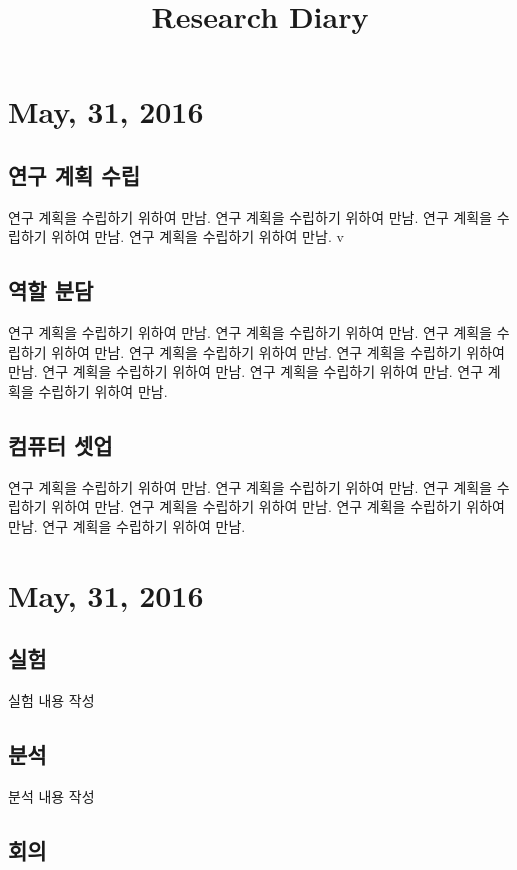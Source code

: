 \documentclass{research-note-v1.0}
\begin{document}
	\title{Research Diary}
			
	\section*{May, 31, 2016}
	\subsection*{연구 계획 수립}
							연구 계획을 수립하기 위하여 만남.
							연구 계획을 수립하기 위하여 만남.
								연구 계획을 수립하기 위하여 만남.
									연구 계획을 수립하기 위하여 만남.
									v
	
    \subsection*{역할 분담}
			연구 계획을 수립하기 위하여 만남.
				연구 계획을 수립하기 위하여 만남.
					연구 계획을 수립하기 위하여 만남.
						연구 계획을 수립하기 위하여 만남.
							연구 계획을 수립하기 위하여 만남.
								연구 계획을 수립하기 위하여 만남.
									연구 계획을 수립하기 위하여 만남.
										연구 계획을 수립하기 위하여 만남.
	\subsection*{컴퓨터 셋업}
		연구 계획을 수립하기 위하여 만남.
			연구 계획을 수립하기 위하여 만남.
				연구 계획을 수립하기 위하여 만남.
					연구 계획을 수립하기 위하여 만남.
						연구 계획을 수립하기 위하여 만남.
							연구 계획을 수립하기 위하여 만남.

\section*{May, 31, 2016}

\subsection*{실험}

실험 내용 작성

\subsection*{분석}

 분석 내용 작성

\subsection*{회의}
\end{document}
